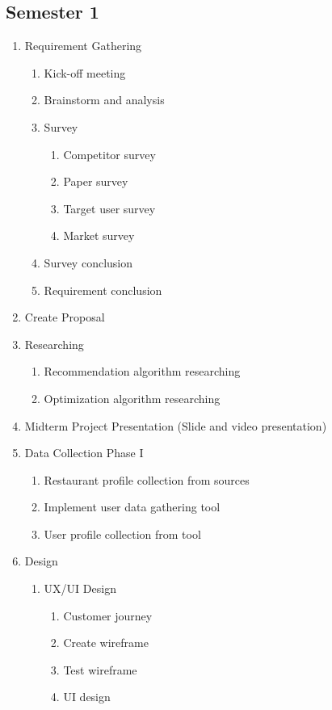 \documentclass[12pt,oneside,openright,a4paper]{cpe-english-project}
\begin{document}
\subsection{Semester 1}
\begin{enumerate}
  \item Requirement Gathering
  \begin{enumerate}
    \item Kick-off meeting
    \item Brainstorm and analysis
    \item Survey
     \begin{enumerate}
      \item Competitor survey
      \item Paper survey
      \item Target user survey
      \item Market survey
     \end{enumerate}
    \item Survey conclusion
    \item Requirement conclusion
  \end{enumerate}
  \item Create Proposal
  \item Researching
  \begin{enumerate}
   \item Recommendation algorithm researching
   \item Optimization algorithm researching
  \end{enumerate}
  \item Midterm Project Presentation (Slide and video presentation)
  \item Data Collection Phase I
  \begin{enumerate}
   \item Restaurant profile collection from sources
   \item Implement user data gathering tool
   \item User profile collection from tool
  \end{enumerate}
  \item Design
  \begin{enumerate}
   \item UX/UI Design
   	\begin{enumerate}
  	 \item Customer journey
      \item Create wireframe
      \item Test wireframe
      \item UI design

\end{enumerate}
\end{enumerate}
\end{enumerate}
\end{document}
